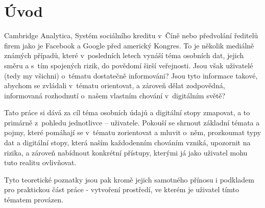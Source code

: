 \chapter*{Úvod}
\pagestyle{plain}

Cambridge Analytica, Systém sociálního kreditu v~Číně nebo předvolání ředitelů firem jako je Facebook a Google před americký Kongres. To je několik mediálně známých případů, které v~posledních letech vynáší téma osobních dat, jejich směru a s~tím spojených rizik, do povědomí širší veřejnosti.
Jsou však uživatelé (tedy my všichni) o~tématu dostatečně informováni? Jsou tyto informace takové, abychom se zvládali v~tématu orientovat, a zároveň dělat zodpovědná, informovaná rozhodnutí o~našem vlastním chování v~digitálním světě?

Tato práce si dává za cíl téma osobních údajů a digitální stopy zmapovat, a to primárně z~pohledu jednotlivce -- uživatele. Pokouší se shrnout základní témata a pojmy, které pomáhají se v~tématu zorientovat a mluvit o~něm, prozkoumat typy dat a digitální stopy, která naším každodenním chováním vzniká, upozornit na rizika, a zároveň nabídnout konkrétní přístupy, kterými já jako uživatel 
mohu tuto realitu ovlivňovat.

Tyto teoretické poznatky jsou pak kromě jejich samotného přínosu i podkladem pro praktickou část práce - vytvoření prostředí, ve kterém je uživatel tímto tématem provázen. 

